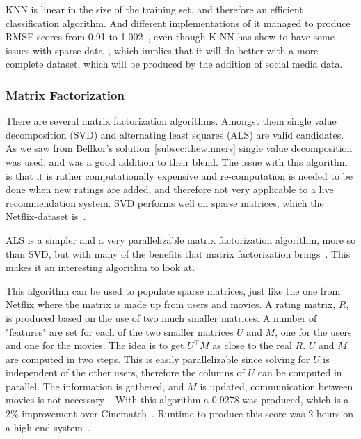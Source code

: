 KNN is linear in the size of the training set, and therefore an efficient classification algorithm\cite{introtoIR}. And different implementations of it managed to produce RMSE scores from 0.91 to 1.002~\cite{knnnetflixstand, knnoldies, knnimpl, knncolbgroup}, even though K-NN has show to have some issues with sparse data~\cite{grobelnikDataSparsityIssues}, which implies that it will do better with a more complete dataset, which will be produced by the addition of social media data.


\subsubsection{Matrix Factorization}\label{subsubsec:matrixfac}
There are several matrix factorization algorithms. Amongst them single value decomposition (SVD) and alternating least squares (ALS) are valid candidates. As we saw from Bellkor's solution~\ref{subsec:thewinners} single value decomposition was used, and was a good addition to their blend. The issue with this algorithm is that it is rather computationally expensive and re-computation is needed to be done when new ratings are added, and therefore not very applicable to a live recommendation system. SVD performs well on sparse matrices, which the Netflix-dataset is~\cite{grobelnikDataSparsityIssues}.

ALS is a simpler and a very parallelizable matrix factorization algorithm, more so than SVD, but with many of the benefits that matrix factorization brings~\cite{predusingmatrix}. This makes it an interesting algorithm to look at.

This algorithm can be used to populate sparse matrices, just like the one from Netflix where the matrix is made up from users and movies. A rating matrix, $R$, is produced based on the use of two much smaller matrices. A number of "features" are set for each of the two smaller matrices $U$ and $M$, one for the users and one for the movies. The idea is to get $U^\top M$ as close to the real $R$. $U$ and $M$ are computed in two steps. This is easily parallelizable since solving for $U$ is independent of the other users, therefore the columns of $U$ can be computed in parallel. The information is gathered, and $M$ is updated, communication between movies is not necessary~\cite{myrrix}. With this algorithm a 0.9278 was produced, which is a 2\% improvement over Cinematch~\cite{predusingmatrix}. Runtime to produce this score was 2 hours on a high-end system~\cite{alsMPI}.


